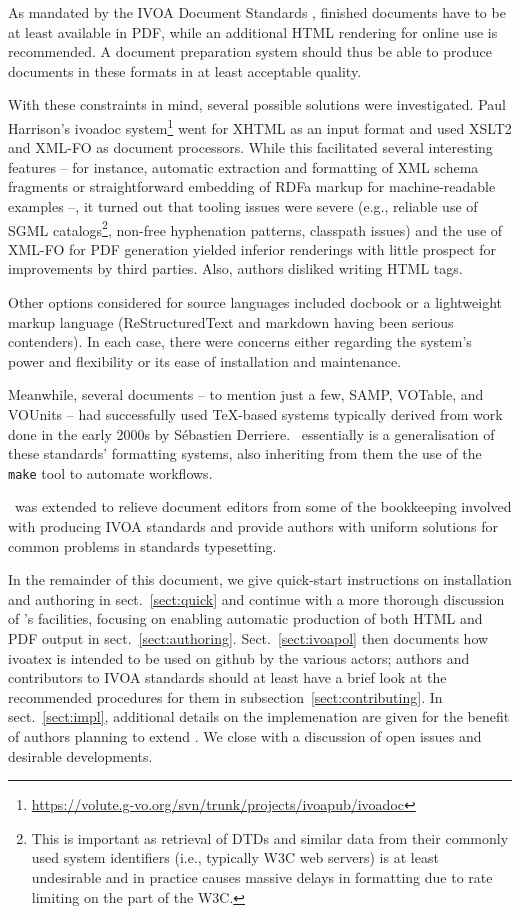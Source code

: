 \documentclass[11pt,a4paper]{ivoa}
\begin{document}
As mandated by the IVOA Document Standards \citep{2017ivoa.spec.0517G},
finished documents have to be at
least available in PDF, while an additional HTML rendering for online
use is recommended.  A document preparation system should thus be
able  to produce documents in these formats in at least acceptable
quality.

With these constraints in mind, several possible solutions were
investigated.  Paul
Harrison's ivoadoc
system\footnote{\url{https://volute.g-vo.org/svn/trunk/projects/ivoapub/ivoadoc}}
went for XHTML as
an input format and used XSLT2 and XML-FO as document processors.  While
this facilitated several interesting features  -- for instance,
automatic extraction and formatting of XML schema fragments or
straightforward embedding of RDFa markup for machine-readable examples
--, it turned out that tooling issues were severe (e.g., reliable use
of SGML catalogs\footnote{This is important as retrieval of DTDs and
similar data from their commonly used system identifiers (i.e.,
typically W3C web servers) is at least undesirable and in practice
causes massive delays in formatting due to rate limiting on the part of
the W3C.}, non-free hyphenation patterns, classpath issues) and the use
of XML-FO for PDF generation yielded inferior renderings with little
prospect for improvements by third parties. Also, authors disliked
writing HTML tags.

Other options considered for source languages included docbook or
a lightweight markup language (ReStructuredText and markdown having
been serious contenders).
In each case, there were concerns either regarding the system's power
and flexibility or its ease of installation and maintenance.

Meanwhile, several documents -- to mention just a few, SAMP, VOTable,
and VOUnits -- had successfully used \TeX-based systems typically
derived from work done in the early 2000s by S\'ebastien Derriere.
\ivoatex\ essentially is a generalisation of these standards' formatting
systems, also inheriting from them the use of the \texttt{make} tool to
automate workflows.

\ivoatex\ was extended to relieve document editors from some of the
bookkeeping involved with producing IVOA standards and provide authors
with uniform solutions for common problems in standards typesetting.

In the remainder of this document, we give quick-start instructions
on installation and authoring in sect.~\ref{sect:quick} and continue
with
a more thorough discussion of \ivoatex's facilities, focusing
on enabling automatic production of both HTML and PDF output in
sect.~\ref{sect:authoring}.
Sect.~\ref{sect:ivoapol} then documents how ivoatex is intended to be
used on github by the various actors; authors and contributors to IVOA
standards should at least have a brief look at the recommended
procedures for them in subsection~\ref{sect:contributing}.
In sect.~\ref{sect:impl}, additional
details on the implemenation are given for the benefit of authors
planning to extend \ivoatex.  We close with a discussion of open issues
and desirable developments.
\end{document}
